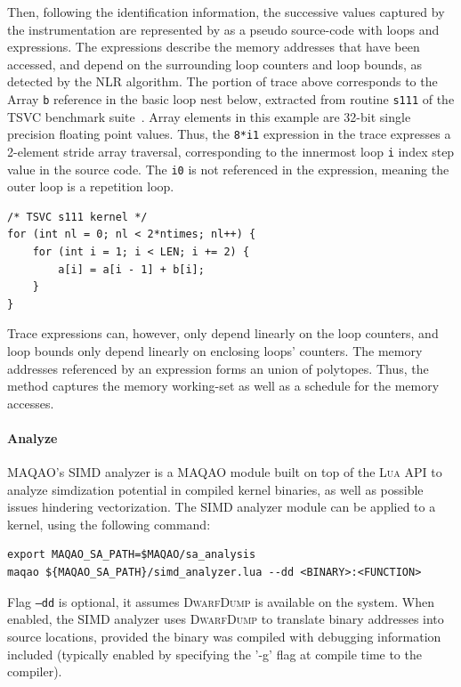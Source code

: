 \documentclass[11pt, a4paper, twoside]{montblanc2}
\def\lua{\textsc{Lua}\xspace}
\def\dd{\textsc{DwarfDump}\xspace}
\begin{document}
Then, following the identification information, the successive values captured
by the instrumentation are represented by as a pseudo source-code with loops and
expressions. The expressions describe the memory addresses that have been
accessed, and depend on the surrounding loop counters and loop bounds, as
detected by the NLR algorithm. The portion of trace above corresponds to the
Array \texttt{b} reference in the basic loop nest below, extracted from routine
\texttt{s111} of the TSVC benchmark
suite~\cite{maleki:vectorization:pact:2011,callahan:tsvc:sc:1988}. Array
elements in this example are 32-bit single precision floating point values. Thus, the
\texttt{8*i1} expression in the trace expresses a 2-element stride array
traversal, corresponding to the innermost loop \texttt{i} index step value in the
source code. The \texttt{i0} is not referenced in the expression, meaning the
outer loop is a repetition loop.

\lstset{style=C}
\begin{lstlisting}
/* TSVC s111 kernel */
for (int nl = 0; nl < 2*ntimes; nl++) {
	for (int i = 1; i < LEN; i += 2) {
		a[i] = a[i - 1] + b[i];
	}
}
\end{lstlisting}

Trace expressions can, however, only depend linearly on the loop counters, and
loop bounds only depend linearly on enclosing loops' counters. The memory
addresses referenced by an expression forms an union of polytopes. Thus, the
method captures the memory working-set as well as a schedule for the memory
accesses.

\paragraph{Analyze}

MAQAO's SIMD analyzer is a MAQAO module built on top of the \lua API to analyze
simdization potential in compiled kernel binaries, as well as possible issues
hindering vectorization. The SIMD analyzer module can be applied to a kernel,
using the following command:

\begin{verbatim}
export MAQAO_SA_PATH=$MAQAO/sa_analysis
maqao ${MAQAO_SA_PATH}/simd_analyzer.lua --dd <BINARY>:<FUNCTION>
\end{verbatim}

Flag \texttt{--dd} is optional, it assumes \dd is available on the system. When
enabled, the SIMD analyzer uses \dd to translate binary addresses into source
locations, provided the binary was compiled with debugging information included
(typically enabled by specifying the '-g' flag at compile time to the compiler).
\end{document}
